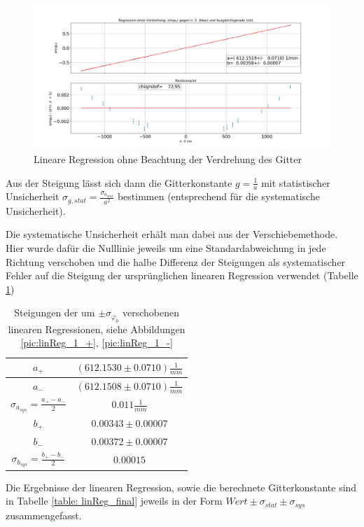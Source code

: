 \documentclass[a4paper, 11pt]{article}
\begin{document}
\textwidth
\begin{figure}[H]
	\hskip-2cm
	\includegraphics[scale=0.4]{./Bilder/Gitter_Regression_ohne_Verdrehung.png}
	\caption{Lineare Regression ohne Beachtung der Verdrehung des Gitter}
	\label{pic:linReg_1}	
\end{figure}

Aus der Steigung lässt sich dann die Gitterkonstante $g = \frac{1}{a}$ mit statistischer Unsicherheit $ \sigma_{g, stat} = \frac{\sigma_{a_{stat}}}{a^2}$ bestimmen (entsprechend für die systematische Unsicherheit).  

Die systematische Unsicherheit erhält man dabei aus der Verschiebemethode. Hier wurde dafür die Nulllinie jeweils um eine Standardabweichung in jede Richtung verschoben und die halbe Differenz der Steigungen als systematischer Fehler auf die Steigung der ursprünglichen linearen Regression verwendet (Tabelle \ref{table: aSys})
\begin{table}[H]
	\renewcommand{\arraystretch}{1.5}
	\large
	\centering
	\begin{tabular}{|c|c|}
		\hline
		$a_+$	&	$(612.1530 \pm 0.0710) \frac{1}{mm}$ \\
		\hline
		$a_-$	&	$(612.1508 \pm 0.0710) \frac{1}{mm}$ \\
		\hline
		$\sigma_{a_{sys}} = \frac{a_+ - a_-}{2}$	&	$ 0.011 \frac{1}{mm} $ \\
		\hline
		$b_+$	&	$0.00343 \pm 0.00007$ \\
		\hline
		$b_-$	&	$0.00372 \pm 0.00007$ \\
		\hline
		$\sigma_{b_{sys}} = \frac{b_+ - b_-}{2}$	&	$ 0.00015 $ \\
		\hline
	\end{tabular}
	\caption{Steigungen der um $\pm \sigma_{\varphi_0}$ verschobenen linearen Regressionen, siehe Abbildungen \ref{pic:linReg_1_+}, \ref{pic:linReg_1_-}}
	\label{table: aSys}
\end{table}
Die Ergebnisse der linearen Regression, sowie die berechnete Gitterkonstante sind in Tabelle \ref{table: linReg_final} jeweils in der Form $Wert \pm \sigma_{stat} \pm \sigma_{sys}$ zusammengefasst.
\end{document}
